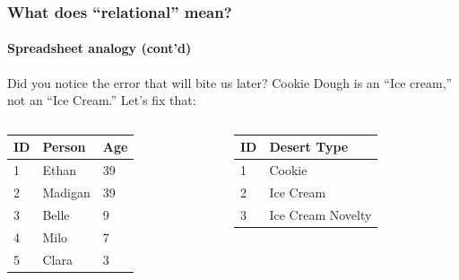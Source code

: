 \documentclass[aspectratio=169]{beamer}
\begin{document}
\begin{frame}
  \frametitle{What does ``relational'' mean?}
  \framesubtitle{Spreadsheet analogy (cont'd)}

  Did you notice the error that will bite us later? Cookie Dough is an ``Ice cream,'' not an ``Ice
  Cream.'' Let's fix that:

  \begin{columns}[T]
    \begin{column}{0.3\textwidth}
      \begin{table}[]
        \footnotesize
        \begin{tabular}{@{}lll@{}}
          \toprule
          ID & Person  & Age \\ \midrule
          1  & Ethan   & 39  \\
          2  & Madigan & 39  \\
          3  & Belle   & 9   \\
          4  & Milo    & 7   \\
          5  & Clara   & 3   \\ \bottomrule
        \end{tabular}
      \end{table}
    \end{column}
    \begin{column}{0.5\textwidth}
      \begin{table}[]
        \footnotesize
        \begin{tabular}{@{}ll@{}}
          \toprule
          ID & Desert Type       \\ \midrule
          1  & Cookie            \\
          2  & Ice Cream         \\
          3  & Ice Cream Novelty \\ \bottomrule
        \end{tabular}
      \end{table}
    \end{column}
  \end{columns}


\end{frame}
\end{document}
